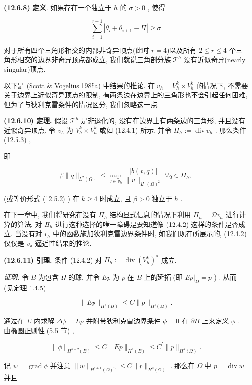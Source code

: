 \textbf{(12.6.8) 定义.} 如果存在一个独立于 $h$ 的 $\sigma > 0$ , 使得

\begin{equation}\label{eq:12.6.9}
\sum_{i = 1}^{r - 1} |\theta_{i} + \theta_{i + 1} - \varPi| \geq \sigma
\end{equation}

对于所有四个三角形相交的内部非奇异顶点(此时 $r = 4$)以及所有 $2 \leq r \leq 4$ 个三角形相交的边界非奇异顶点都成立, 我们就说三角剖分族 $\mathcal{T}^{h}$ 没有近似奇异(nearly singular)顶点.

以下是 (Scott \& Vogelius 1985a) 中结果的推论. 在 $v_{h} = V_{h}^{k} \times V_{h}^{k}$ 的情况下, 不需要关于边界上近似奇异顶点的限制, 有两条边在边界上的三角形也不会引起任何困难, 但为了与狄利克雷条件的情况区分, 我们忽略这一点.

\textbf{(12.6.10) 定理.} 假设 $\mathcal{T}^{h}$ 是非退化的, 没有在边界上有两条边的三角形, 并且没有近似奇异顶点. 令 $v_{h}$ 为 $V_{h}^{k} \times V_{h}^{k}$ 或如 (12.4.1) 所示, 并令 $\varPi_{h} \mathrel{\text{:=}} \operatorname{div}v_{h}$ . 那么条件 (12.5.3) ,

即

$$
\beta \|q\|_{L^{2}(\Omega)} \leq \sup_{v \in v_{h}} \frac{|b(v,q)|}{\|v\|_{H^{1}(\Omega)^{2}}} \;\forall q \in \varPi_{h},
$$

(或等价形式 (12.5.2) ) 在 $k \geq 4$ 时成立, 且 $\beta > 0$ 独立于 $h$ .

在下一章中, 我们将研究在没有 $\varPi_{h}$ 结构显式信息的情况下利用 $\varPi_{h} = \mathcal{D}v_{h}$ 进行计算的算法. 对 $\varPi_{h}$ 进行这种选择的唯一障碍是要知道像 (12.4.2) 这样的条件是否成立. 当没有对 $v_{h}$ 中的函数施加狄利克雷边界条件时, 如我们现在所展示的, (12.4.2) 仅仅是 $v_{h}$ 逼近性结果的推论.

\textbf{(12.6.11) 引理.} 条件 (12.4.2) 对 $\varPi_{h} \mathrel{\text{:=}} \operatorname{div}(V_{h}^{k})^{n}$ 成立.

\textit{证明.} 令 $B$ 为包含 $\Omega$ 的球, 并令 $Ep$ 为 $p$ 在 $B$ 上的延拓 (即 $Ep|_{\Omega} = p$ ) , 从而 (见定理 1.4.5)

$$
\|Ep\|_{H^{s}(B)} \leq C \|p\|_{H^{s}(\Omega)}.
$$

通过在 $B$ 内求解 $\Delta \phi = Ep$ 并附带狄利克雷边界条件 $\phi = 0$ 在 $\partial B$ 上来定义 $\phi$ . 由椭圆正则性 (5.5 节) ,

$$
\|\phi\|_{H^{s + 2}(B)} \leq C \|Ep\|_{H^{s}(B)} \leq C^{\prime} \|p\|_{H^{s}(\Omega)}.
$$

记 $\underline{w} = \operatorname{grad}\phi$ 并注意 $\|\underline{w}\|_{H^{s + 1}(\Omega)^{n}} \leq C \|p\|_{H^{s}(\Omega)}$ . 那么在 $\Omega$ 中 $p = \operatorname{div}\underline{w}$ 并且

